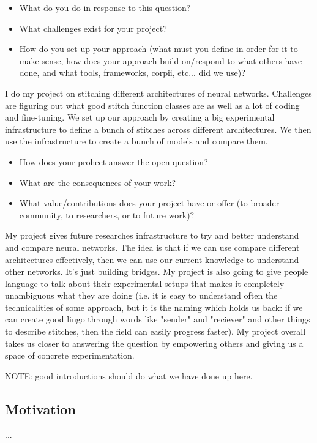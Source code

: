 \documentclass{article} %
\begin{document}
\begin{itemize}
   \item What do you do in response to this question?
   \item What challenges exist for your project?
   \item How do you set up your approach (what must you define in order for it to make sense, how does your approach build on/respond to what others have done, and what tools, frameworks, corpii, etc... did we use)?
\end{itemize}

I do my project on stitching different architectures of neural networks. Challenges are figuring out what good stitch function classes
are as well as a lot of coding and fine-tuning. We set up our approach by creating a big experimental infrastructure to define a bunch of
stitches across different architectures. We then use the infrastructure to create a bunch of models and compare them.

\begin{itemize}
   \item How does your prohect answer the open question?
   \item What are the consequences of your work?
   \item What value/contributions does your project have or offer (to broader community, to researchers, or to future work)?
\end{itemize}

My project gives future researches infrastructure to try and better understand and compare neural networks. The idea is that
if we can use compare different architectures effectively, then we can use our current knowledge to understand other networks.
It's just building bridges. My project is also going to give people language to talk about their experimental setups that makes
it completely unambiguous what they are doing (i.e. it is easy to understand often the technicalities of some approach, but it
is the naming which holds us back: if we can create good lingo through words like "sender" and "reciever" and other things to
describe stitches, then the field can easily progress faster). My project overall takes us closer to answering the question by
empowering others and giving us a space of concrete experimentation.

NOTE: good introductions should do what we have done up here.

\subsection{Motivation}
...
\end{document}
